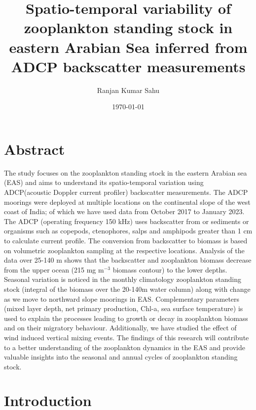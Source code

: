 \documentclass{article}
\title{Spatio-temporal variability of zooplankton standing stock in eastern Arabian Sea inferred from ADCP backscatter measurements }
\author{Ranjan Kumar Sahu}
\date{\today}
\begin{document}
	
	\maketitle
	
	\section*{Abstract}
	
	The study focuses on the zooplankton standing stock in the eastern Arabian sea (EAS) and aims to understand its spatio-temporal variation using ADCP(acoustic Doppler current profiler) backscatter measurements. The ADCP moorings were deployed at multiple locations on the continental slope of the west coast of India; of which we have used data from October 2017 to January 2023. The ADCP (operating frequency 150 kHz) uses backscatter from or sediments or organisms such as copepods, ctenophores, salps and amphipods greater than 1 cm to calculate current profile. The conversion from backscatter to biomass is based on volumetric zooplankton sampling at the respective locations. Analysis of the data over 25-140 m shows that the backscatter and zooplankton biomass decrease from the upper ocean (215 mg m$^{-3}$ biomass contour) to the lower depths. Seasonal variation is noticed in the monthly climatology zooplankton standing stock (integral of the biomass over the 20-140m water column) along with change as we move to northward slope moorings in EAS. Complementary parameters (mixed layer depth, net primary production, Chl-a, sea surface temperature) is used to explain the processes leading to growth or decay in zooplankton biomass and on their migratory behaviour. Additionally, we have studied the effect of wind induced vertical mixing events. The findings of this research will contribute to a better understanding of the zooplankton dynamics in the EAS and provide valuable insights into the seasonal and annual cycles of zooplankton standing stock.
	
	\newpage
	\section{Introduction}
\end{document}
